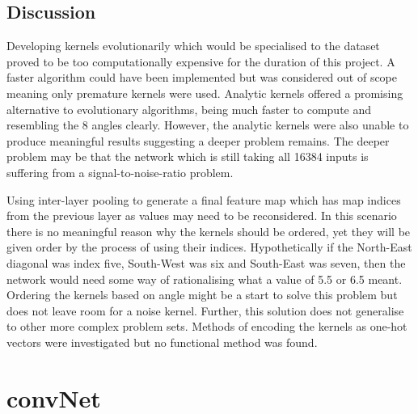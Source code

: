 \subsection{Discussion}
Developing kernels evolutionarily which would be specialised to the dataset proved to be too computationally expensive for the duration of this project. 
A faster algorithm could have been implemented but was considered out of scope meaning only premature kernels were used.
Analytic kernels offered a promising alternative to evolutionary algorithms, being much faster to compute and resembling the 8 angles clearly.
However, the analytic kernels were also unable to produce meaningful results suggesting a deeper problem remains. 
The deeper problem may be that the network which is still taking all 16384 inputs is suffering from a signal-to-noise-ratio problem.

Using inter-layer pooling to generate a final feature map which has map indices from the previous layer as values may need to be reconsidered.
In this scenario there is no meaningful reason why the kernels should be ordered, yet they will be given order by the process of using their indices.
Hypothetically if the North-East diagonal was index five, South-West was six and South-East was seven, then the network would need some way of rationalising what a value of 5.5 or 6.5 meant. 
Ordering the kernels based on angle might be a start to solve this problem but does not leave room for a noise kernel.
Further, this solution does not generalise to other more complex problem sets.
Methods of encoding the kernels as one-hot vectors were investigated but no functional method was found. 


\section{convNet}

